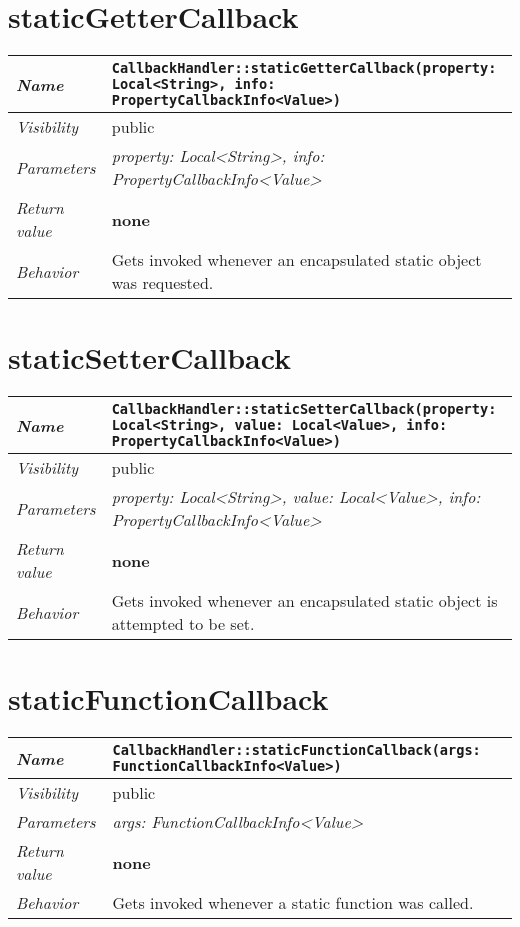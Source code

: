  \section{staticGetterCallback}
\begin{longtable}{p{3cm} @{\hskip 1cm} p{12cm}}
 \hline
\textit{Name} & \texttt{CallbackHandler::staticGetterCallback(property: Local<String>, info: PropertyCallbackInfo<Value>)}\\
\hline
 \textit{Visibility} & public\\
\hline
\textit{Parameters} & \textit{property: Local<String>, info: PropertyCallbackInfo<Value>}\\
\hline
\textit{Return value} & \textbf{none}\\
  \hline
 \textit{Behavior} &  Gets invoked whenever an encapsulated static object was requested.\\
\hline
\end{longtable}
 \section{staticSetterCallback}
\begin{longtable}{p{3cm} @{\hskip 1cm} p{12cm}}
 \hline
\textit{Name} & \texttt{CallbackHandler::staticSetterCallback(property: Local<String>, value: Local<Value>, info: PropertyCallbackInfo<Value>)}\\
\hline
 \textit{Visibility} & public\\
\hline
\textit{Parameters} & \textit{property: Local<String>, value: Local<Value>, info: PropertyCallbackInfo<Value>}\\
\hline
\textit{Return value} & \textbf{none}\\
  \hline
 \textit{Behavior} & Gets invoked whenever an encapsulated static object is attempted to be set.\\
\hline
\end{longtable} 
 \section{staticFunctionCallback}
\begin{longtable}{p{3cm} @{\hskip 1cm} p{12cm}}
 \hline
\textit{Name} & \texttt{CallbackHandler::staticFunctionCallback(args: FunctionCallbackInfo<Value>)}\\
\hline
 \textit{Visibility} & public\\
\hline
\textit{Parameters} & \textit{args: FunctionCallbackInfo<Value>}\\
\hline
\textit{Return value} & \textbf{none}\\
  \hline
 \textit{Behavior} & Gets invoked whenever a static function was called.\\
\hline
\end{longtable} \pagebreak
